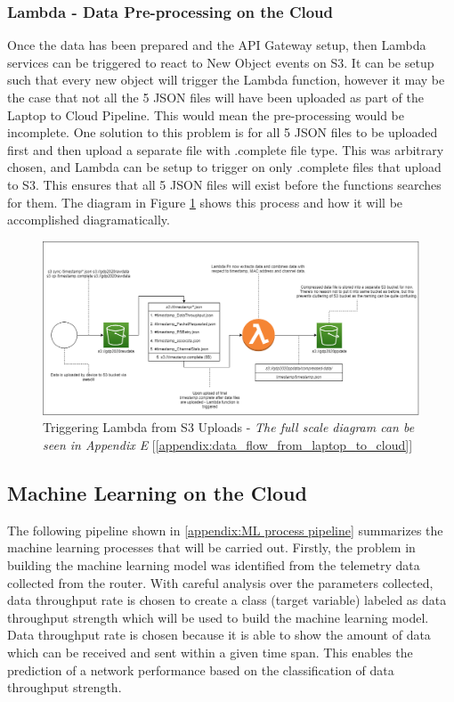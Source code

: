 \subsubsection{Lambda - Data Pre-processing on the Cloud}
\label{cloud_lambda}
Once the data has been prepared and the API Gateway setup, then Lambda services can be triggered to react to New Object events on S3. It can be setup such that every new object will trigger the Lambda function, however it may be the case that not all the 5 JSON files will have been uploaded as part of the Laptop to Cloud Pipeline. This would mean the pre-processing would be incomplete. One solution to this problem is for all 5 JSON files to be uploaded first and then upload a separate file with .complete file type. This was arbitrary chosen, and Lambda can be setup to trigger on only .complete files that upload to S3. This ensures that all 5 JSON files will exist before the functions searches for them. The diagram in Figure \ref{fig:s3_lambda_s3} shows this process and how it will be accomplished diagramatically.

\begin{figure}[ht]
    \centering
    \includegraphics[width=1\linewidth]{pages/Chapter3/Chapter 3 images/S3_to_Lambda_to_S3.png}
    \caption{Triggering Lambda from S3 Uploads - \textit{The full scale diagram can be seen in Appendix E} [\ref{appendix:data_flow_from_laptop_to_cloud}]}
    \label{fig:s3_lambda_s3}
\end{figure}

\subsection{Machine Learning on the Cloud}

The following pipeline shown in \ref{appendix:ML process pipeline} summarizes the machine learning processes that will be carried out.
Firstly, the problem in building the machine learning model was identified from the telemetry data collected from the router. With careful analysis over the parameters collected, data throughput rate is chosen to create a class (target variable) labeled as data throughput strength which will be used to build the machine learning model. Data throughput rate is chosen because it is able to show the amount of data which can be received and sent within a given time span. This enables the prediction of a network performance based on the classification of data throughput strength.

